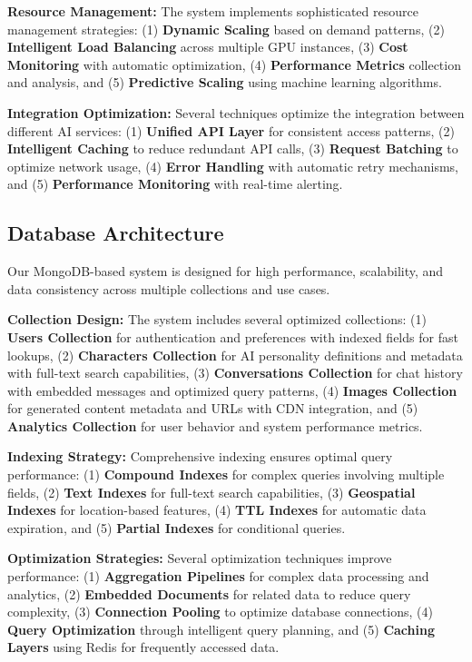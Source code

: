 \documentclass[conference]{IEEEtran}
\begin{document}
\textbf{Resource Management:} The system implements sophisticated resource management strategies: (1) \textbf{Dynamic Scaling} based on demand patterns, (2) \textbf{Intelligent Load Balancing} across multiple GPU instances, (3) \textbf{Cost Monitoring} with automatic optimization, (4) \textbf{Performance Metrics} collection and analysis, and (5) \textbf{Predictive Scaling} using machine learning algorithms.

\textbf{Integration Optimization:} Several techniques optimize the integration between different AI services: (1) \textbf{Unified API Layer} for consistent access patterns, (2) \textbf{Intelligent Caching} to reduce redundant API calls, (3) \textbf{Request Batching} to optimize network usage, (4) \textbf{Error Handling} with automatic retry mechanisms, and (5) \textbf{Performance Monitoring} with real-time alerting.

\subsection{Database Architecture}
Our MongoDB-based system is designed for high performance, scalability, and data consistency across multiple collections and use cases.

\textbf{Collection Design:} The system includes several optimized collections: (1) \textbf{Users Collection} for authentication and preferences with indexed fields for fast lookups, (2) \textbf{Characters Collection} for AI personality definitions and metadata with full-text search capabilities, (3) \textbf{Conversations Collection} for chat history with embedded messages and optimized query patterns, (4) \textbf{Images Collection} for generated content metadata and URLs with CDN integration, and (5) \textbf{Analytics Collection} for user behavior and system performance metrics.

\textbf{Indexing Strategy:} Comprehensive indexing ensures optimal query performance: (1) \textbf{Compound Indexes} for complex queries involving multiple fields, (2) \textbf{Text Indexes} for full-text search capabilities, (3) \textbf{Geospatial Indexes} for location-based features, (4) \textbf{TTL Indexes} for automatic data expiration, and (5) \textbf{Partial Indexes} for conditional queries.

\textbf{Optimization Strategies:} Several optimization techniques improve performance: (1) \textbf{Aggregation Pipelines} for complex data processing and analytics, (2) \textbf{Embedded Documents} for related data to reduce query complexity, (3) \textbf{Connection Pooling} to optimize database connections, (4) \textbf{Query Optimization} through intelligent query planning, and (5) \textbf{Caching Layers} using Redis for frequently accessed data.
\end{document}
